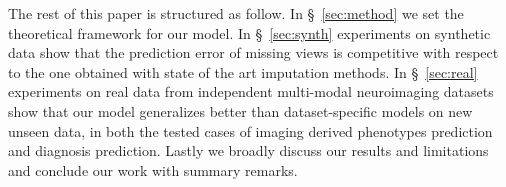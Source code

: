 The rest of this paper is structured as follow.
In \S~\ref{sec:method} we set the theoretical framework for our model.
In \S~\ref{sec:synth} experiments on synthetic data show that the prediction error of missing views is competitive with respect to the one obtained with state of the art imputation methods.
In \S~\ref{sec:real} experiments on real data from independent multi-modal neuroimaging datasets show that our model generalizes better than dataset-specific models on new unseen data, in both the tested cases of imaging derived phenotypes prediction and diagnosis prediction.
Lastly we broadly discuss our results and limitations and conclude our work with summary remarks.
